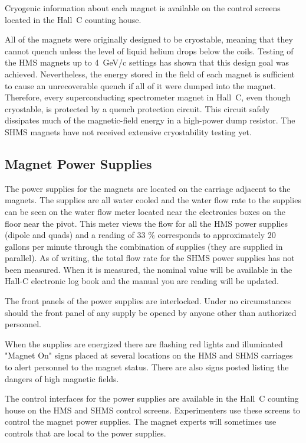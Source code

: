Cryogenic information about each magnet is available on the control
screens located in the Hall~C counting house.

All of the magnets were originally designed to be cryostable, meaning that they
cannot quench unless the level of liquid helium drops below the coils. Testing of
the HMS magnets up to 4~GeV/c settings has shown that this design goal
was achieved. Nevertheless, the energy stored in the field of each magnet is sufficient
to cause an unrecoverable quench if all of it were dumped into the magnet.
Therefore, every superconducting spectrometer magnet in Hall~C, even though
cryostable, is protected by a quench protection circuit. This circuit safely dissipates
much of the magnetic-field energy in a high-power dump resistor. The SHMS
magnets have not received extensive cryostability testing yet.

\subsection {Magnet Power Supplies}

The power supplies for the magnets are located on the carriage
adjacent to the magnets. The supplies are all water cooled and
the water flow rate to the supplies can be seen on the water flow
meter located near the electronics boxes on the floor near the pivot.
This meter views the flow for all the HMS power supplies
(dipole and quads) and a reading of 33 $\%$ corresponds to approximately
20 gallons per minute through the combination of supplies (they are supplied
in parallel).
As of writing, the total flow rate for the SHMS power supplies has not been
measured. When it is measured, the nominal value will be available in the Hall-C electronic log book
and the manual you are reading will be updated.

The front panels of the power supplies are interlocked. Under
no circumstances should the front panel of any supply be opened by anyone other
than authorized personnel.

When the supplies are energized there are flashing red lights  and
illuminated "Magnet On" signs placed at
several locations on the HMS and SHMS carriages to alert personnel to the magnet
status. There are also signs posted listing the dangers of high magnetic
fields.

The control interfaces for the power supplies are available in the
Hall~C counting house on the HMS and SHMS control screens. Experimenters
use these screens to control the magnet power supplies. The magnet experts
will sometimes use controls that are local to the power supplies.

